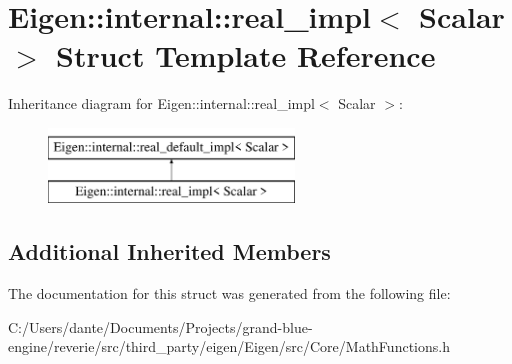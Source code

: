 \hypertarget{struct_eigen_1_1internal_1_1real__impl}{}\section{Eigen\+::internal\+::real\+\_\+impl$<$ Scalar $>$ Struct Template Reference}
\label{struct_eigen_1_1internal_1_1real__impl}
Inheritance diagram for Eigen\+::internal\+::real\+\_\+impl$<$ Scalar $>$\+:\begin{figure}[H]
\begin{center}
\leavevmode
\includegraphics[height=2.000000cm]{struct_eigen_1_1internal_1_1real__impl}
\end{center}
\end{figure}
\subsection*{Additional Inherited Members}


The documentation for this struct was generated from the following file\+:\begin{DoxyCompactItemize}
\item 
C\+:/\+Users/dante/\+Documents/\+Projects/grand-\/blue-\/engine/reverie/src/third\+\_\+party/eigen/\+Eigen/src/\+Core/Math\+Functions.\+h\end{DoxyCompactItemize}
